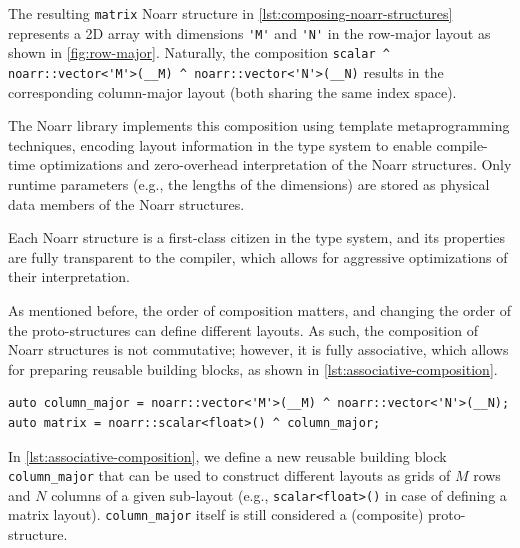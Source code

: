 The resulting \texttt{matrix} Noarr structure in \cref{lst:composing-noarr-structures} represents a 2D array with dimensions \lstinline{'M'} and \lstinline{'N'} in the row-major layout as shown in \cref{fig:row-major}. Naturally, the composition \lstinline{scalar ^ noarr::vector<'M'>(__M) ^ noarr::vector<'N'>(__N)} results in the corresponding column-major layout (both sharing the same index space).


The Noarr library implements this composition using template metaprogramming techniques, encoding layout information in the type system to enable compile-time optimizations and zero-overhead interpretation of the Noarr structures. Only runtime parameters (e.g., the lengths of the dimensions) are stored as physical data members of the Noarr structures.

Each Noarr structure is a first-class citizen in the \cpp type system, and its properties are fully transparent to the compiler, which allows for aggressive optimizations of their interpretation.


As mentioned before, the order of composition matters, and changing the order of the proto-structures can define different layouts. As such, the composition of Noarr structures is not commutative; however, it is fully associative, which allows for preparing reusable building blocks, as shown in \cref{lst:associative-composition}.

\begin{lstlisting}[style=C++, caption={Associative composition of Noarr structures.}, label={lst:associative-composition}]
auto column_major = noarr::vector<'M'>(__M) ^ noarr::vector<'N'>(__N);
auto matrix = noarr::scalar<float>() ^ column_major;
\end{lstlisting}

In \cref{lst:associative-composition}, we define a new reusable building block \texttt{column\_major} that can be used to construct different layouts as grids of $M$ rows and $N$ columns of a given sub-layout (e.g., \lstinline{scalar<float>()} in case of defining a matrix layout). \lstinline{column_major} itself is still considered a (composite) proto-structure.


